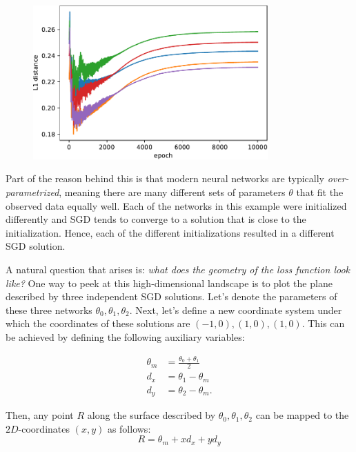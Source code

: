 \documentclass[12pt]{article}
\begin{document}
\begin{figure}[h]
\centering
\includegraphics[width=9cm]{plots/1d_ens_param_distance.pdf}
\caption{}
\label{fig_n1d_ens_param_distance}
\end{figure}

Part of the reason behind this is that modern neural networks are typically \textit{over-parametrized}, meaning there are many different sets of parameters $\theta$ that fit the observed data equally well. \cite{underspecification, deep_ens, mode_connect} Each of the networks in this example were initialized differently and SGD tends to converge to a solution that is close to the initialization. Hence, each of the different initializations resulted in a different SGD solution.

A natural question that arises is: \textit{what does the geometry of the loss function look like?} One way to peek at this high-dimensional landscape is to plot the plane described by three independent SGD solutions. Let's denote the parameters of these three networks $\theta_0, \theta_1, \theta_2$. Next, let's define a new coordinate system under which the coordinates of these solutions are $(-1, 0), (1, 0), (1, 0)$. This can be achieved by defining the following auxiliary variables:

\begin{align}
\theta_m &= \frac{\theta_0 + \theta_1}{2} \\
d_x &= \theta_1 - \theta_m \\
d_y &= \theta_2 - \theta_m.
\end{align}

Then, any point $R$ along the surface described by $\theta_0, \theta_1, \theta_2$ can be mapped to the $2D$-coordinates $(x, y)$ as follows:
$$
R = \theta_m + x d_x + y d_y
$$
\end{document}
